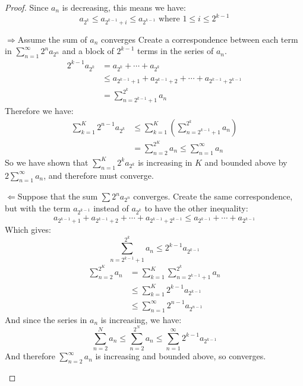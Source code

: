 \documentclass[../Main.tex]{subfiles}
\begin{document}
\begin{proof}
    Since $a_n$ is decreasing, this means we have:
    \begin{equation*}
        a_{2^k} \leq a_{2^{k-1}+i} \leq a_{2^{k-1}} \text{ where } 1 \leq i \leq 2^{k-1}
    \end{equation*}
    \begin{proofdirection}{$\Rightarrow$}{Assume the sum of $a_n$ converges}
        Create a correspondence between each term in $\sum_{n=1}^\infty 2^n a_{2^n}$ and a block of $2^{k-1}$ terms in the series of $a_n$.
        \begin{align*}
            2^{k-1} a_{2^k} &= a_{2^k} + \cdots + a_{2^k} \\
            &\leq a_{2^{k-1}+1} + a_{2^{k-1}+2} + \cdots + a_{2^{k-1}+2^{k-1}} \\
            &= \sum_{n=2^{k-1}+1}^{2^k} a_n
        \end{align*}
        Therefore we have:
        \begin{align*}
            \sum_{k=1}^{K} 2^{n-1} a_{2^k} &\leq \sum_{k=1}^{K} \left(\sum_{n=2^{k-1} + 1}^{2^k} a_n\right) \\
            &= \sum_{n=2}^{2^K} a_n \leq \sum_{n=1}^\infty a_n
        \end{align*}
        So we have shown that $\sum_{n=1}^K 2^k a_{2^k}$ is increasing in $K$ and bounded above by $2\sum_{n=1}^\infty a_n$, and therefore must converge.
    \end{proofdirection}
    \begin{proofdirection}{$\Leftarrow$}{Suppose that the sum $\sum 2^n a_{2^n}$ converges.}
        Create the same correspondence, but with the term $a_{2^{k-1}}$ instead of $a_{2^k}$ to have the other inequality:
        \begin{equation*}
            a_{2^{k-1}+1} + a_{2^{k-1}+2} + \cdots + a_{2^{k-1}+2^{k-1}} \leq a_{2^{k-1}} + \cdots + a_{2^{k-1}}
        \end{equation*}
        Which gives:
        \begin{equation*}
            \sum_{n=2^{k-1}+1}^{2^k} a_n \leq 2^{k-1} a_{2^{k-1}}
        \end{equation*}
        \begin{align*}
            \sum_{n=2}^{2^K} a_n &= \sum_{k=1}^K \sum_{n=2^{k-1}+1}^{2^k} a_n \\
            &\leq \sum_{k=1}^K 2^{k-1}a_{2^{k-1}} \\
            &\leq \sum_{n=1}^\infty 2^{n-1} a_{2^{n-1}}
        \end{align*}
        And since the series in $a_n$ is increasing, we have:
        \begin{equation*}
            \sum_{n=2}^N a_n \leq \sum_{n=2}^{2^N} a_n \leq \sum_{n=1}^\infty 2^{k-1}a_{2^{k-1}}
        \end{equation*}
        And therefore $\sum_{n=2}^\infty a_n$ is increasing and bounded above, so converges.
    \end{proofdirection}
\end{proof}
\end{document}
